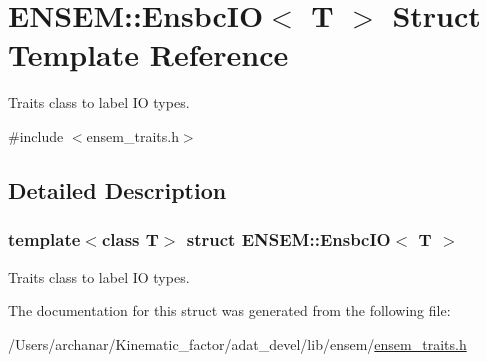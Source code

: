 \hypertarget{structENSEM_1_1EnsbcIO}{}\section{E\+N\+S\+EM\+:\+:Ensbc\+IO$<$ T $>$ Struct Template Reference}
\label{structENSEM_1_1EnsbcIO}


Traits class to label IO types.  




{\ttfamily \#include $<$ensem\+\_\+traits.\+h$>$}



\subsection{Detailed Description}
\subsubsection*{template$<$class T$>$\newline
struct E\+N\+S\+E\+M\+::\+Ensbc\+I\+O$<$ T $>$}

Traits class to label IO types. 

The documentation for this struct was generated from the following file\+:\begin{DoxyCompactItemize}
\item 
/\+Users/archanar/\+Kinematic\+\_\+factor/adat\+\_\+devel/lib/ensem/\mbox{\hyperlink{lib_2ensem_2ensem__traits_8h}{ensem\+\_\+traits.\+h}}\end{DoxyCompactItemize}
